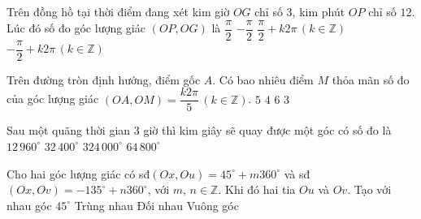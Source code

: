 \begin{ex}%
	Trên đồng hồ tại thời điểm đang xét kim giờ $OG$ chỉ số $3$, kim phút $OP$ chỉ số $12$. Lúc đó số đo góc lượng giác  $\left(OP,OG\right)$ là
	\choice 
		 {$\dfrac{\pi}{2}$}
		{$-\dfrac{\pi}{2}$} 
		{$\dfrac{\pi}{2}+k2\pi\,\left(k\in\mathbb{Z}\right)$} 
		 {\True $-\dfrac{\pi}{2}+k2\pi\,\left(k\in\mathbb{Z}\right)$}
\end{ex}

\begin{ex}%
	Trên đường tròn định hướng, điểm gốc $A$. Có bao nhiêu điểm $M$ thỏa mãn số đo của góc lượng giác  $\left(OA,OM\right)=\dfrac{k2\pi}{5}\,\left(k\in\mathbb{Z}\right)$.
	 \choice
		{\True $5$} 
		 {$4$}
		 {$6$}
		{$3$} 
\end{ex}

\begin{ex}%
	Sau một quãng thời gian $3$ giờ thì  kim giây sẽ quay được một góc có số đo là
	 \choice
		 {$12\,960^\circ$}
		 {$32\,400^\circ$}
		 {$324\,000^\circ$}
		 {\True $64\,800^\circ$}
\end{ex}

\begin{ex}%
	Cho hai góc lượng giác có sđ$\left(Ox,Ou\right)=45^\circ +m360^\circ$ và sđ$\left(Ox,Ov\right)=-135^\circ +n360^\circ$, với $m$, $ n\in \mathbb{Z}$. Khi đó hai tia  $Ou$ và $Ov$.
	\choice 
		{Tạo  với nhau góc $45^\circ$}
		 {Trùng nhau}
		{\True Đối  nhau}
		{Vuông  góc}
\end{ex}

